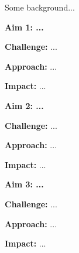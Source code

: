 \vspace{1cm}

Some background...

\vspace{1cm}

\noindent\textbf{Aim 1: ...}

\vspace{0.3cm}
\textbf{Challenge:} ... 

\vspace{0.3cm}
\textbf{Approach:} ... 

\vspace{0.3cm}
\textbf{Impact:} ...

\vspace{1cm}
\noindent\textbf{Aim 2: ...}

\vspace{0.3cm}
\textbf{Challenge:} ... 

\vspace{0.3cm}
\textbf{Approach:} ... 

\vspace{0.3cm}
\textbf{Impact:} ...

\vspace{1cm}
\noindent\textbf{Aim 3: ...}

\vspace{0.3cm}
\textbf{Challenge:} ... 

\vspace{0.3cm}
\textbf{Approach:} ... 

\vspace{0.3cm}
\textbf{Impact:} ...
